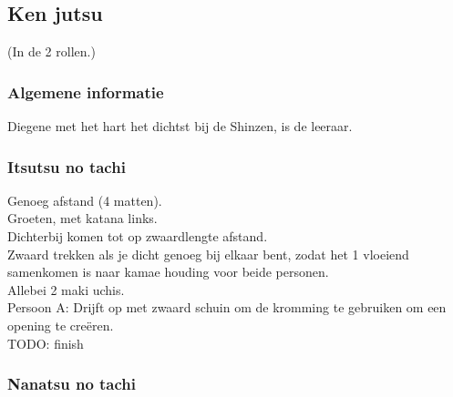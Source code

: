 
\newcommand{\suwaristart}{
Suwari houding. Rechterknie naar voor, linkerknie links onder een hoek van 45 graden. Hand open op het rechterbeen leggen, net voor de knie en met de handpalm naar boven gericht.\\
Linkerhand houdt de saya vast, met de wijsvinger achter de tsuba vanonder (zodat hij er niet kan uitvallen) en de duim er boven op, maar net iets meer langs de binnenkant. Je moet opletten dat je, bij het trekken van het zwaard, niet in je duim snijdt. En je duim (in combinatie met je wijsvinger) kan een boost geven aan de tsuba, zodat het handvat losklikt uit de saya en eruit schiet. Daarmee win je iets extra aan tijd.\\
Rechterhand komt boven je handvat en schuift 1 handlengte richting tsuba.\\
Dan draait de rechterhand om. Dit zou de perfecte lengte moeten zijn, zodat je het zwaard ineens kunt vastpakken net onder de tsuba.\\}

\subsection{Ken jutsu}
(In de 2 rollen.)

\subsubsection{Algemene informatie}

Diegene met het hart het dichtst bij de Shinzen, is de leeraar.\\

\subsubsection{Itsutsu no tachi}

Genoeg afstand (4 matten).\\
Groeten, met katana links.\\
Dichterbij komen tot op zwaardlengte afstand.\\
Zwaard trekken als je dicht genoeg bij elkaar bent, zodat het 1 vloeiend samenkomen is naar kamae houding voor beide personen.\\
Allebei 2 maki uchis.\\
Persoon A: Drijft op met zwaard schuin om de kromming te gebruiken om een opening te cre\"{e}ren.\\
TODO: finish

\subsubsection{Nanatsu no tachi}

